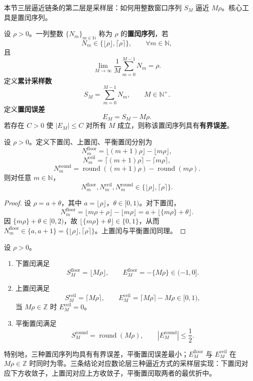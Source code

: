 本节三层逼近链条的第二层是采样层：如何用整数窗口序列 $S_M$ 逼近 $M\rho$。核心工具是置闰序列。

\begin{definition}[置闰序列与累计采样数]\label{def:intercalation_sequence_harmonic}
设 \(\rho>0\)。一列整数 \(\{N_m\}_{m\in\mathbb{N}}\) 称为 \(\rho\) 的\textbf{置闰序列}，若
\[
N_m\in\{\lfloor\rho\rfloor,\lceil\rho\rceil\},\qquad \forall m\in\mathbb{N},
\]
且
\[
\lim_{M\to\infty}\frac{1}{M}\sum_{m=0}^{M-1}N_m=\rho.
\]
定义\textbf{累计采样数}
\[
S_M=\sum_{m=0}^{M-1}N_m,\qquad M\in\mathbb{N}^+.
\]
定义\textbf{置闰误差}
\[
E_M=S_M-M\rho.
\]
若存在 \(C>0\) 使 \(|E_M|\le C\) 对所有 \(M\) 成立，则称该置闰序列具有\textbf{有界误差}。
\end{definition}

\begin{lemma}[基本置闰序列的取值]\label{lem:intercalation_values_harmonic}
设 \(\rho>0\)。定义下置闰、上置闰、平衡置闰分别为
\[
N_m^{\mathrm{floor}}=\lfloor (m+1)\rho\rfloor-\lfloor m\rho\rfloor,
\]
\[
N_m^{\mathrm{ceil}}=\lceil (m+1)\rho\rceil-\lceil m\rho\rceil,
\]
\[
N_m^{\mathrm{round}}=\operatorname{round}((m+1)\rho)-\operatorname{round}(m\rho).
\]
则对任意 \(m\in\mathbb{N}\)，
\[
N_m^{\mathrm{floor}},N_m^{\mathrm{ceil}},N_m^{\mathrm{round}}\in\{\lfloor\rho\rfloor,\lceil\rho\rceil\}.
\]
\end{lemma}

\begin{proof}
设 \(\rho=a+\theta\)，其中 \(a=\lfloor\rho\rfloor\)，\(\theta\in[0,1)\)。对下置闰，
\[
N_m^{\mathrm{floor}}=\lfloor m\rho+\rho\rfloor-\lfloor m\rho\rfloor
=a+\lfloor\{m\rho\}+\theta\rfloor.
\]
因 \(\{m\rho\}+\theta\in[0,2)\)，故 \(\lfloor\{m\rho\}+\theta\rfloor\in\{0,1\}\)，从而 \(N_m^{\mathrm{floor}}\in\{a,a+1\}=\{\lfloor\rho\rfloor,\lceil\rho\rceil\}\)。上置闰与平衡置闰同理。
\end{proof}

\begin{theorem}[置闰误差有界定理]\label{thm:intercalation_error_bound_harmonic}
设 \(\rho>0\)。
\begin{enumerate}[label=(\roman*)]
    \item 下置闰满足
    \[
    S_M^{\mathrm{floor}}=\lfloor M\rho\rfloor,\qquad
    E_M^{\mathrm{floor}}=-\{M\rho\}\in(-1,0].
    \]
    \item 上置闰满足
    \[
    S_M^{\mathrm{ceil}}=\lceil M\rho\rceil,\qquad
    E_M^{\mathrm{ceil}}=\lceil M\rho\rceil-M\rho\in[0,1),
    \]
    当 $M\rho\in\mathbb Z$ 时 $E_M^{\mathrm{ceil}}=0$。
    \item 平衡置闰满足
    \[
    S_M^{\mathrm{round}}=\operatorname{round}(M\rho),\qquad
    |E_M^{\mathrm{round}}|\le\frac12.
    \]
\end{enumerate}
特别地，三种置闰序列均具有有界误差，平衡置闰误差最小；$E_M^{\mathrm{floor}}$ 与 $E_M^{\mathrm{ceil}}$ 在 $M\rho\in\mathbb Z$ 时同时为零。三条结论对应数论层三种逼近方式的采样层实现：下置闰对应下方收敛子，上置闰对应上方收敛子，平衡置闰取两者的最优折中。
\end{theorem}

